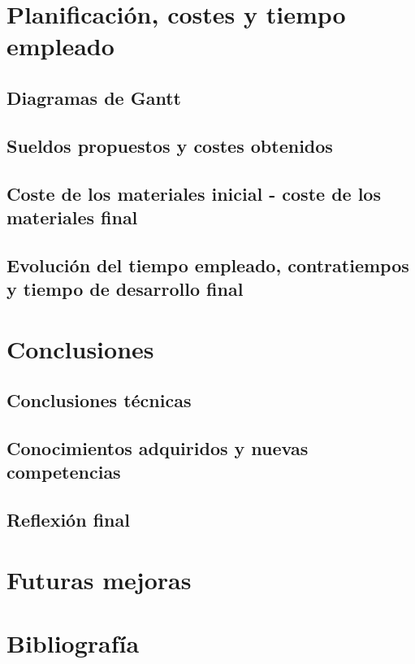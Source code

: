 \chapter{Planificación, costes y tiempo empleado}

\section{Diagramas de Gantt}

\section{Sueldos propuestos y costes obtenidos}

\section{Coste de los materiales inicial - coste de los materiales final}

%
\section{Evolución del tiempo empleado, contratiempos y tiempo de desarrollo final}
\label{sec:3derr}


\chapter{Conclusiones}

\section{Conclusiones técnicas}

\section{Conocimientos adquiridos y nuevas competencias}

\section{Reflexión final}


\chapter{Futuras mejoras}


\chapter*{Bibliografía}


\appendix
